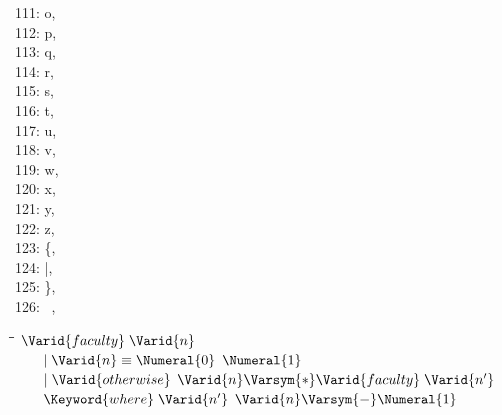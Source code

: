 \documentclass{article}
\begin{document}
{\begin{tabbing}
111: o, \\
112: p, \\
113: q, \\
114: r, \\
115: s, \\
116: t, \\
117: u, \\
118: v, \\
119: w, \\
120: x, \\
121: y, \\
122: z, \\
123: \{, \\
124: |, \\
125: \}, \\
126: ~, 
\end{tabbing}}

\newcommand{\Sep}{\+}
\begin{tabbing}
\qquad\=\hspace{\lwidht}\=\hspace{\cwidth}\=\+\kill
$\Varid{faculty}\;\Varid{n}$\\
$\qquad\mid \Varid{n}\equiv \Numeral{0}$ \Sep \makebox[\cwidth]{$\mathrel{=}$} \Sep ${\Numeral{1}}$\\
$\qquad\mid \Varid{otherwise}$ \Sep \makebox[\cwidth]{$\mathrel{=}$} \Sep ${\Varid{n}\Varsym{*}\Varid{faculty}\;\Varid{n'}}$\\
$\qquad\Keyword{where}\;\Varid{n'}$ \Sep \makebox[\cwidth]{$\mathrel{=}$} \Sep ${\Varid{n}\Varsym{-}\Numeral{1}\;}$
\end{tabbing}
\end{document}
